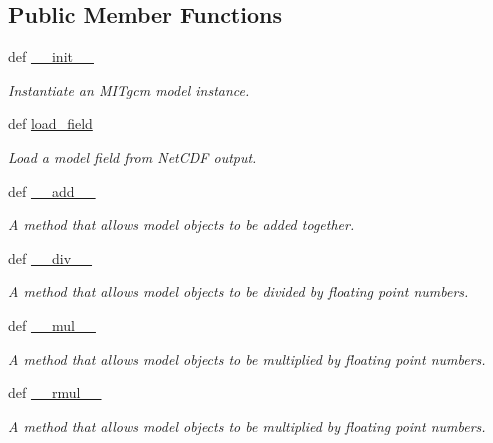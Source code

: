 \subsection*{Public Member Functions}
\begin{DoxyCompactItemize}
\item 
def \hyperlink{classmitgcm_1_1core_1_1MITgcm__Simulation_aac012c75a0f5dce8bbc4b00422a12444}{\+\_\+\+\_\+init\+\_\+\+\_\+}
\begin{DoxyCompactList}\small\item\em Instantiate an M\+I\+Tgcm model instance. \end{DoxyCompactList}\item 
def \hyperlink{classmitgcm_1_1core_1_1MITgcm__Simulation_a975760ba1406c74ad06af11ca3925397}{load\+\_\+field}
\begin{DoxyCompactList}\small\item\em Load a model field from Net\+C\+D\+F output. \end{DoxyCompactList}\item 
def \hyperlink{classmitgcm_1_1core_1_1MITgcm__Simulation_a43a67ae2588987ada32f505473d469c8}{\+\_\+\+\_\+add\+\_\+\+\_\+}
\begin{DoxyCompactList}\small\item\em A method that allows model objects to be added together. \end{DoxyCompactList}\item 
def \hyperlink{classmitgcm_1_1core_1_1MITgcm__Simulation_a64a9a65d7ed0ae3344e09dc6a36d41e0}{\+\_\+\+\_\+div\+\_\+\+\_\+}
\begin{DoxyCompactList}\small\item\em A method that allows model objects to be divided by floating point numbers. \end{DoxyCompactList}\item 
def \hyperlink{classmitgcm_1_1core_1_1MITgcm__Simulation_a7827aeb019dd9f93317770e830db03d3}{\+\_\+\+\_\+mul\+\_\+\+\_\+}
\begin{DoxyCompactList}\small\item\em A method that allows model objects to be multiplied by floating point numbers. \end{DoxyCompactList}\item 
def \hyperlink{classmitgcm_1_1core_1_1MITgcm__Simulation_aafdbbd993c0424568a4534edf643d312}{\+\_\+\+\_\+rmul\+\_\+\+\_\+}
\begin{DoxyCompactList}\small\item\em A method that allows model objects to be multiplied by floating point numbers. \end{DoxyCompactList}\end{DoxyCompactItemize}
